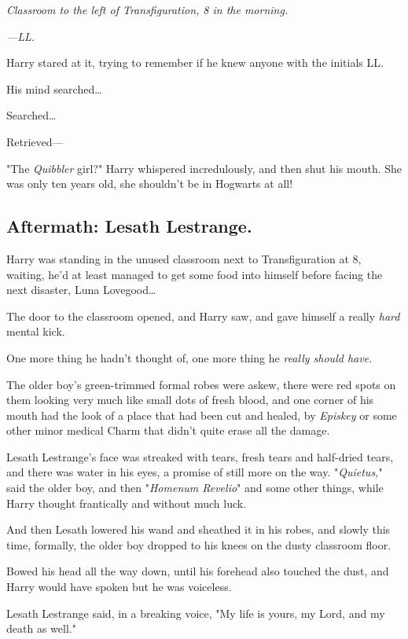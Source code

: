 \emph{Classroom to the left of Transfiguration, 8 in the morning.}

\emph{---LL.}

Harry stared at it, trying to remember if he knew anyone with the initials LL.

His mind searched{\ldots}

Searched{\ldots}

Retrieved---

"The \emph{Quibbler} girl?" Harry whispered incredulously, and then shut his 
mouth. She was only ten years old, she shouldn't be in Hogwarts at all!
\sbreak
\vspace{-2\baselineskip}
\subsection{Aftermath: Lesath Lestrange.}

Harry was standing in the unused classroom next to Transfiguration at 8\AM, 
waiting, he'd at least managed to get some food into himself before facing the 
next disaster, Luna Lovegood{\ldots}

The door to the classroom opened, and Harry saw, and gave himself a really 
\emph{hard} mental kick.

One more thing he hadn't thought of, one more thing he \emph{really should 
have.}

The older boy's green-trimmed formal robes were askew, there were red spots on 
them looking very much like small dots of fresh blood, and one corner of his 
mouth had the look of a place that had been cut and healed, by \emph{Episkey} 
or some other minor medical Charm that didn't quite erase all the damage.

Lesath Lestrange's face was streaked with tears, fresh tears and half-dried 
tears, and there was water in his eyes, a promise of still more on the way. 
"\emph{Quietus,}" said the older boy, and then "\emph{Homenum Revelio}" and 
some other things, while Harry thought frantically and without much luck.

And then Lesath lowered his wand and sheathed it in his robes, and slowly this 
time, formally, the older boy dropped to his knees on the dusty classroom floor.

Bowed his head all the way down, until his forehead also touched the dust, and 
Harry would have spoken but he was voiceless.

Lesath Lestrange said, in a breaking voice, "My life is yours, my Lord, and my 
death as well."

